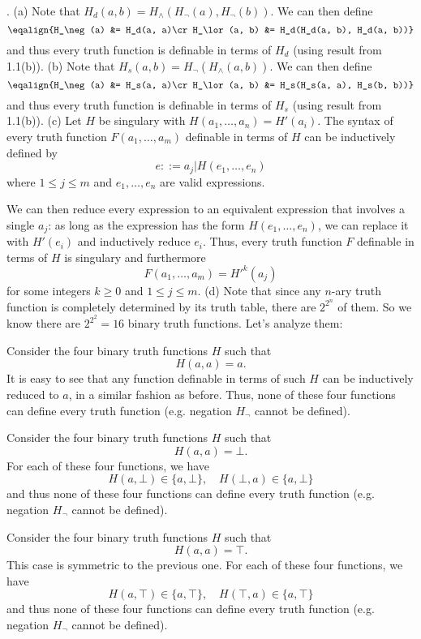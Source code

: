 . 
\ansitem (a) Note that $H_d(a, b) = H_\land(H_\neg(a), H_\neg(b))$. We can then define
$$\eqalign{H_\neg(a) &= H_d(a, a)\cr
H_\lor(a, b) &= H_d(H_d(a, b), H_d(a, b))}$$
and thus every truth function is definable in terms of $H_d$ 
(using result from 1.1(b)).
\smallskip
\ansitem (b) Note that $H_s(a, b) = H_\neg(H_\land(a, b))$. We can then define
$$\eqalign{H_\neg(a) &= H_s(a, a)\cr
H_\lor(a, b) &= H_s(H_s(a, a), H_s(b, b))}$$
and thus every truth function is definable in terms of $H_s$ 
(using result from 1.1(b)).
\smallskip
\ansitem (c) Let $H$ be singulary with $H(a_1, \dots, a_n) = H'(a_i)$.
The syntax of every truth function $F(a_1, \dots, a_m)$ definable 
in terms of $H$ can be inductively defined by
$$
e ::= a_j \vert H(e_1, \dots, e_n)
$$
where $1 \le j \le m$ and $e_1, \dots, e_n$ are valid expressions.

We can then reduce every expression to an equivalent expression that 
involves a single $a_j$: as long as the expression has the form $H(e_1, \dots, e_n)$,
we can replace it with $H'(e_i)$ and inductively reduce $e_i$. Thus, every truth 
function $F$ definable in terms of $H$ is singulary and furthermore
$$
F(a_1, \dots, a_m) = {H'}^k(a_j)
$$
for some integers $k \ge 0$ and $1 \le j \le m$.
\smallskip
\ansitem (d) Note that since any $n$-ary truth function is completely 
determined by its truth table, there are $2^{2^n}$ of them. So we know
there are $2^{2^2}=16$ binary truth functions. Let's analyze them:

\itemitem{-} Consider the four binary truth functions $H$ such that
$$
H(a, a) = a.
$$
It is easy to see that any function definable in terms of such $H$ can be 
inductively reduced to $a$, in a similar fashion as before. Thus, none of these four
functions can define every truth function (e.g. negation $H_{\neg}$ cannot
be defined).

\itemitem{-} Consider the four binary truth functions $H$ such that
$$
H(a,a) = \bot.
$$
For each of these four functions, we have
$$
H(a,\bot) \in \{a, \bot\}, \quad H(\bot, a) \in \{a, \bot\}
$$
and thus none of these four functions can define every truth function (e.g. 
negation $H_{\neg}$ cannot be defined).

\itemitem{-} Consider the four binary truth functions $H$ such that
$$
H(a,a) = \top.
$$
This case is symmetric to the previous one. For each of these four functions, we have
$$
H(a,\top) \in \{a, \top\}, \quad H(\top, a) \in \{a, \top\}
$$
and thus none of these four functions can define every truth function (e.g. 
negation $H_{\neg}$ cannot be defined).

